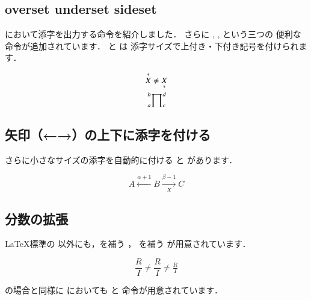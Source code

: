 \begin{inout}
\subsection{overset underset sideset}
において添字を出力する命令を紹介しました．
さらに , ,  という三つの
便利な命令が追加されています． と  は
添字サイズで上付き・下付き記号を付けられます．%

\begin{inout}
\begin{gather*}
\overset{*}{X} \neq \underset{*}{X}\\
\sideset{_a^b}{_c^d}{\prod}
\end{gather*} 
\end{inout}

\subsection{矢印（←→）の上下に添字を付ける}
さらに小さなサイズの添字を自動的に付ける  
と  があります．
\begin{usage}
\xleftarrow}[$\<下付き文字>$]{$\<上付き文字>$}
\xrightarrow}[$\<下付き文字>$]{$\<上付き文字>$}
\end{usage}

\begin{inout}
\[ A \xleftarrow{\alpha + 1} B
 \xrightarrow[X]{\beta -1} C \]
\end{inout}

\subsection{分数の拡張}

\LaTeX 標準の  以外にも，を補う ，
 を補う が用意されています．

\begin{inout}
\[ \frac{R}{I} \neq \dfrac{R}{I} \neq \tfrac{R}{I} \]
\end{inout}

の場合と同様に においても  と 
命令が用意されています．


\end{inout}
